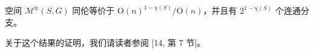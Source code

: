 
\begin{corollary}[11.42]
空间 $\mathcal{M}^{\mathrm{fr}}(S,G)$ 同伦等价于 $\mathrm{O}(n)^{1-\chi(S)}/\mathrm{O}(n)$，并且有 $2^{1-\chi(S)}$ 个连通分支。
\end{corollary}

关于这个结果的证明，我们请读者参阅 [14, 第 7 节]。
